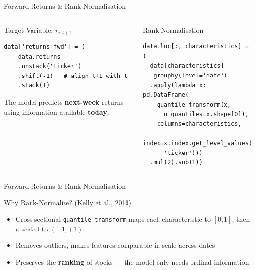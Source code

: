 \documentclass[aspectratio=169, 11pt]{beamer}
\begin{document}
\begin{frame}[fragile]{Forward Returns \& Rank Normalisation}

\begin{columns}[T]
\begin{block}{Target Variable: $r_{i,t+1}$}
\begin{lstlisting}
data['returns_fwd'] = (
    data.returns
    .unstack('ticker')
    .shift(-1)   # align t+1 with t
    .stack())
\end{lstlisting}
The model predicts \textbf{next-week} returns using information available \textbf{today}.
\end{block}

\begin{block}{Rank Normalisation}
\begin{lstlisting}
data.loc[:, characteristics] = (
  data[characteristics]
  .groupby(level='date')
  .apply(lambda x: pd.DataFrame(
    quantile_transform(x,
      n_quantiles=x.shape[0]),
    columns=characteristics,
    index=x.index.get_level_values(
      'ticker')))
  .mul(2).sub(1))
\end{lstlisting}
\end{block}
\end{columns}
\end{frame}
%
%
\begin{frame}[fragile]{Forward Returns \& Rank Normalisation}

\begin{block}{Why Rank-Normalise?  (Kelly et al., 2019)}
\begin{itemize}
  \item Cross-sectional \texttt{quantile\_transform} maps each characteristic to $[0,1]$, then rescaled to $(-1,+1)$
  \item Removes outliers, makes features comparable in scale across dates
  \item Preserves the \textbf{ranking} of stocks --- the model only needs ordinal information
\end{itemize}
\end{block}

\end{frame}
%
%
\end{document}
